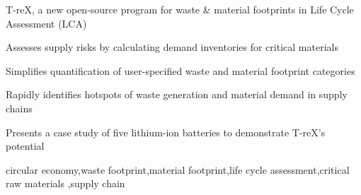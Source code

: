 \documentclass[a4paper,fleqn]{cas-dc}
\begin{document}
\begin{highlights}
	\item T-reX, a new open-source program for waste \& material footprints in Life Cycle Assessment (LCA)
	\item Assesses supply risks by calculating demand inventories for critical materials
	\item Simplifies quantification of user-specified waste and material footprint categories
	\item Rapidly identifies hotspots of waste generation and material demand in supply	chains
	\item Presents a case study of five lithium-ion batteries to demonstrate T-reX's potential
\end{highlights}


\begin{keywords}
circular economy\sep waste footprint\sep material footprint\sep life cycle assessment\sep critical raw materials \sep supply chain
\end{keywords}

\maketitle
\end{document}
